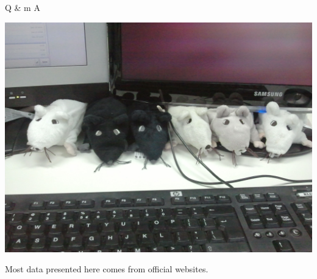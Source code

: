 \documentclass{beamer}
\begin{document}
\begin{frame}
\begin{center}
\Huge{Q \& m A}

\includegraphics[scale=0.1]{../common/questions.jpg} 

\end{center}
\end{frame}


\begin{frame}
\begin{center}
Most data presented here comes from official websites.
\end{center}
\end{frame}
\end{document}
